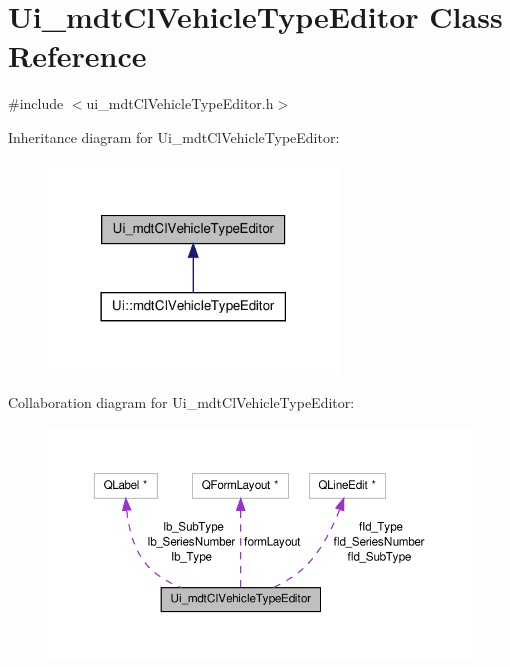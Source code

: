\hypertarget{class_ui__mdt_cl_vehicle_type_editor}{\section{Ui\-\_\-mdt\-Cl\-Vehicle\-Type\-Editor Class Reference}
\label{class_ui__mdt_cl_vehicle_type_editor}
}


{\ttfamily \#include $<$ui\-\_\-mdt\-Cl\-Vehicle\-Type\-Editor.\-h$>$}



Inheritance diagram for Ui\-\_\-mdt\-Cl\-Vehicle\-Type\-Editor\-:\nopagebreak
\begin{figure}[H]
\begin{center}
\leavevmode
\includegraphics[width=218pt]{class_ui__mdt_cl_vehicle_type_editor__inherit__graph}
\end{center}
\end{figure}


Collaboration diagram for Ui\-\_\-mdt\-Cl\-Vehicle\-Type\-Editor\-:\nopagebreak
\begin{figure}[H]
\begin{center}
\leavevmode
\includegraphics[width=350pt]{class_ui__mdt_cl_vehicle_type_editor__coll__graph}
\end{center}
\end{figure}
